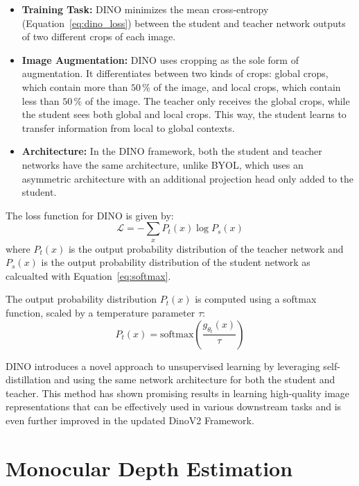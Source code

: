 \begin{itemize}
    \item \textbf{Training Task:} DINO minimizes the mean cross-entropy (Equation~\ref{eq:dino_loss}) between the student and teacher network outputs of two different crops of each image.
    \item \textbf{Image Augmentation:} DINO uses cropping as the sole form of augmentation. It differentiates between two kinds of crops: global crops, which contain more than $50\,\%$ of the image, and local crops, which contain less than $50\,\%$ of the image. The teacher only receives the global crops, while the student sees both global and local crops. This way, the student learns to transfer information from local to global contexts.
    \item \textbf{Architecture:} In the DINO framework, both the student and teacher networks have the same architecture, unlike BYOL, which uses an asymmetric architecture with an additional projection head only added to the student.
\end{itemize}

The loss function for DINO is given by:
\begin{equation}
    \mathcal{L} = -\sum_{x} P_{t}(x) \log P_{s}(x)
    \label{eq:dino_loss}
\end{equation}
where $P_{t}(x)$ is the output probability distribution of the teacher network and $P_{s}(x)$ is the output probability distribution of the student network as calcualted with Equation~\ref{eq:softmax}.

The output probability distribution $P_{t}(x)$ is computed using a softmax function, scaled by a temperature parameter $\tau$:
\begin{equation}
    P_{t}(x) = \text{softmax}\left(\frac{g_{\theta_t}(x)}{\tau}\right)
    \label{eq:softmax}
\end{equation}

DINO introduces a novel approach to unsupervised learning by leveraging self-distillation and using the same network architecture for both the student and teacher. 
This method has shown promising results in learning high-quality image representations that can be effectively used in various downstream tasks and is even further improved in the updated DinoV2 Framework.

\section{Monocular Depth Estimation}\label{sec:depth-estimation}

